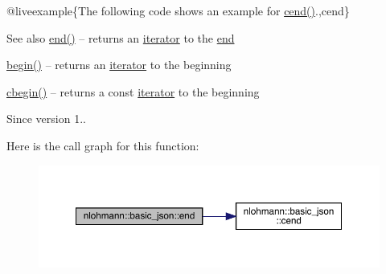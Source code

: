 @liveexample\{The following code shows an example for {\ttfamily \mbox{\hyperlink{classnlohmann_1_1basic__json_a8dba7b7d2f38e6b0c614030aa43983f6}{cend()}}}.,cend\}

\begin{DoxySeeAlso}{See also}
\mbox{\hyperlink{classnlohmann_1_1basic__json_a13e032a02a7fd8a93fdddc2fcbc4763c}{end()}} -- returns an \mbox{\hyperlink{classnlohmann_1_1basic__json_a099316232c76c034030a38faa6e34dca}{iterator}} to the \mbox{\hyperlink{classnlohmann_1_1basic__json_a13e032a02a7fd8a93fdddc2fcbc4763c}{end}} 

\mbox{\hyperlink{classnlohmann_1_1basic__json_a0ff28dac23f2bdecee9564d07f51dcdc}{begin()}} -- returns an \mbox{\hyperlink{classnlohmann_1_1basic__json_a099316232c76c034030a38faa6e34dca}{iterator}} to the beginning 

\mbox{\hyperlink{classnlohmann_1_1basic__json_ad865d6c291b237ae508d5cb2146b5877}{cbegin()}} -- returns a const \mbox{\hyperlink{classnlohmann_1_1basic__json_a099316232c76c034030a38faa6e34dca}{iterator}} to the beginning
\end{DoxySeeAlso}
\begin{DoxySince}{Since}
version 1.. 
\end{DoxySince}
Here is the call graph for this function\+:\nopagebreak
\begin{figure}[H]
\begin{center}
\leavevmode
\includegraphics[width=350pt]{classnlohmann_1_1basic__json_a1c15707055088cd5436ae91db72cbe67_cgraph}
\end{center}
\end{figure}
\mbox{\label{classnlohmann_1_1basic__json_a068a16e76be178e83da6a192916923ed}} 
